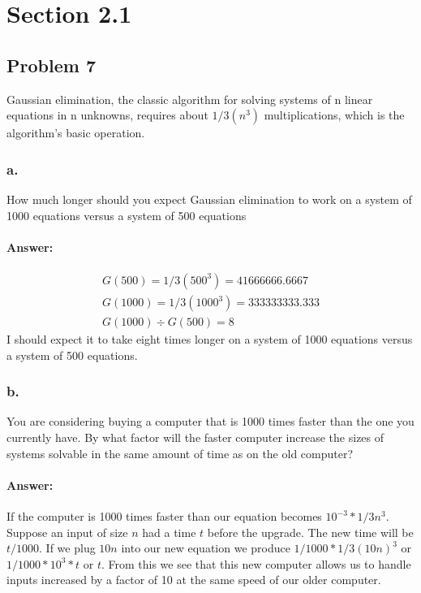 \documentclass{article}
\begin{document}
\section{Section 2.1}
  \subsection{Problem 7}
         Gaussian elimination, the classic algorithm for solving systems of n linear
         equations in n unknowns, requires about $1/3(n^3)$ multiplications, which is the
         algorithm’s basic operation.
     \subsubsection{a. }
          How much longer should you expect Gaussian elimination to work on a
          system of 1000 equations versus a system of 500 equations
        \paragraph{Answer:}
          \begin{align}
            G(500)=1/3(500^3)=41666666.6667 \\
            G(1000)=1/3(1000^3)=333333333.333 \\
            G(1000)\div G(500) = 8
          \end{align}
          I should expect it to take eight times longer on a system of 1000 equations versus a system of 500 equations.
    \subsubsection{b.}
        You are considering buying a computer that is 1000 times faster than the
        one you currently have. By what factor will the faster computer increase
        the sizes of systems solvable in the same amount of time as on the old
        computer?
      \paragraph{Answer:}
        If the computer is 1000 times faster than our equation becomes $10^{-3} * 1/3n^3$. Suppose an input
        of size $n$ had a time $t$ before the upgrade. The new time will be $t/1000$. If we plug $10n$ into our
        new equation we produce $1/1000 * 1/3(10n)^3$ or $1/1000 * 10^3 * t$ or $t$. From this we see that this
        new computer allows us to handle inputs increased by a factor of 10 at the same speed of our older computer.
\end{document}
